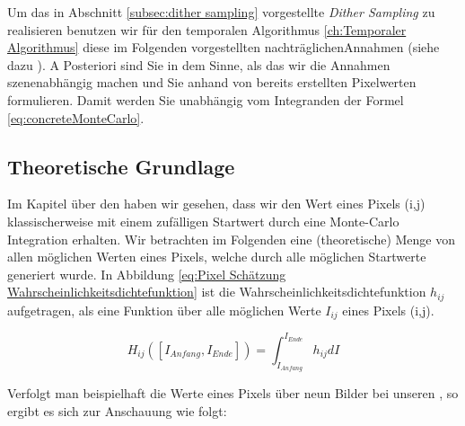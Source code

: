 Um das in Abschnitt \ref{subsec:dither sampling} vorgestellte \textit{Dither Sampling} zu realisieren
benutzen wir für den temporalen Algorithmus \ref{ch:Temporaler Algorithmus} diese im Folgenden vorgestellten
\glqq nachträglichen\grqq Annahmen (siehe dazu \cite{hal02158423}). 
A Posteriori sind Sie in dem Sinne, als das wir die Annahmen szenenabhängig machen und Sie anhand 
von bereits erstellten Pixelwerten formulieren. Damit werden Sie unabhängig vom Integranden der Formel 
\ref{eq:concreteMonteCarlo}.

\subsection{Theoretische Grundlage}

Im Kapitel über den  haben wir gesehen, dass 
wir den Wert eines Pixels (i,j) klassischerweise mit einem zufälligen
Startwert durch eine Monte-Carlo Integration erhalten. Wir betrachten im
Folgenden eine (theoretische) Menge von allen möglichen Werten eines 
Pixels, welche durch alle möglichen Startwerte generiert wurde.
In Abbildung \ref{eq:Pixel Schätzung Wahrscheinlichkeitsdichtefunktion} ist die Wahrscheinlichkeitsdichtefunktion
$h_{ij}$ aufgetragen, als eine Funktion über alle möglichen Werte 
$I_{ij}$ eines Pixels (i,j).

\begin{equation}\label{eq:Pixel Schätzung Wahrscheinlichkeitsdichtefunktion}
    H_{ij}([I_{Anfang},I_{Ende}]) = \int_{I_{Anfang}}^{I_{Ende}} h_{ij} dI
\end{equation}

Verfolgt man beispielhaft die Werte eines Pixels über neun Bilder bei unseren , 
so ergibt es sich zur Anschauung wie folgt:

